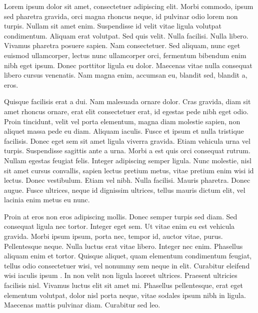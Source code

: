 \documentclass[a5paper]{article}
\begin{document}
\beginnumbering
\pstart
Lorem ipsum %
 dolor %
 sit amet, consectetuer %
 adipiscing elit. Morbi commodo, %
 ipsum sed pharetra gravida, orci magna rhoncus neque, id pulvinar odio lorem non turpis. Nullam sit amet enim. Suspendisse id velit vitae ligula volutpat condimentum. Aliquam %
 erat volutpat. Sed quis velit. Nulla facilisi. Nulla libero. Vivamus pharetra posuere sapien. Nam consectetuer. Sed aliquam, nunc eget euismod ullamcorper, lectus nunc ullamcorper orci, fermentum bibendum enim nibh eget ipsum. Donec porttitor ligula eu dolor. Maecenas vitae nulla consequat libero cursus venenatis. Nam magna enim, accumsan eu, blandit sed, blandit a, eros.

Quisque facilisis erat a dui. Nam malesuada ornare dolor. Cras gravida, diam sit amet rhoncus ornare, erat elit consectetuer erat, id egestas pede nibh eget odio. Proin tincidunt, velit vel porta elementum, magna diam molestie sapien, non aliquet massa pede eu diam. Aliquam iaculis. Fusce et ipsum et nulla tristique facilisis. Donec eget sem sit amet ligula viverra gravida. Etiam vehicula urna vel turpis. Suspendisse sagittis ante a urna. Morbi a est quis orci consequat rutrum. Nullam egestas feugiat felis. Integer adipiscing semper ligula. Nunc molestie, nisl sit amet cursus convallis, sapien lectus pretium metus, vitae pretium enim wisi id lectus. Donec vestibulum. Etiam vel nibh. Nulla facilisi. Mauris pharetra. Donec augue. Fusce ultrices, neque id dignissim ultrices, tellus mauris dictum elit, vel lacinia enim metus eu nunc.

Proin at eros non eros adipiscing mollis. Donec semper turpis sed diam. Sed consequat ligula nec tortor. Integer eget sem. Ut vitae enim eu est vehicula gravida. Morbi ipsum ipsum, porta nec, tempor id, auctor vitae, purus. Pellentesque neque. Nulla luctus erat vitae libero. Integer nec %
 enim. Phasellus aliquam enim et tortor. Quisque aliquet, quam elementum condimentum feugiat, tellus odio consectetuer wisi, vel nonummy sem neque in elit. Curabitur eleifend wisi iaculis ipsum %
. In non velit non ligula laoreet ultrices. Praesent ultricies facilisis nisl. Vivamus luctus elit sit amet mi. Phasellus pellentesque, erat %
 eget elementum volutpat, dolor nisl porta neque, vitae sodales ipsum nibh in ligula. Maecenas mattis pulvinar diam. Curabitur sed leo.
\end{document}
